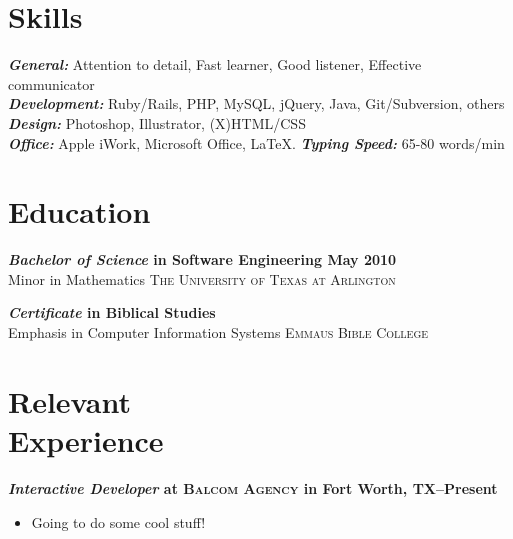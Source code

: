 \documentclass[margin]{res}
\newcommand{\sectionspace}{\vspace{8pt}}
\begin{document}
\begin{resume}

\section{\textsf{Skills}}

                \textbf{\textit{General:}} Attention to detail, Fast learner, Good listener, Effective communicator  \\
                \textbf{\textit{Development:}} Ruby/Rails, PHP, MySQL, jQuery, Java, Git/Subversion, others                \\
                \textbf{\textit{Design:}} Photoshop, Illustrator, (X)HTML/CSS                                       \\
                \textbf{\textit{Office:}} Apple iWork, Microsoft Office, \LaTeX. \textbf{\textit{Typing Speed:}} 65-80 words/min

\sectionspace

\section{\textsf{Education}}

                \textbf{\textit{Bachelor of Science} in Software Engineering \dotfill May 2010 }  \\
								Minor in Mathematics \hfill  \textsc{The University of Texas at Arlington}                                                                
								                
                \textbf{\textit{Certificate} in Biblical Studies  } \\
                Emphasis in Computer Information Systems \hfill  \textsc{Emmaus Bible College}                    

\sectionspace


\section{\textsf{Relevant \\ Experience}} 

                \textbf{\textit{Interactive Developer}
				 at \textsc{Balcom Agency} in Fort Worth, TX--Present}
				 \vspace{-10pt}\begin{itemize} \itemsep -2pt %
				 	\item Going to do some cool stuff!
				 \end{itemize}


\end{resume}
\end{document}
